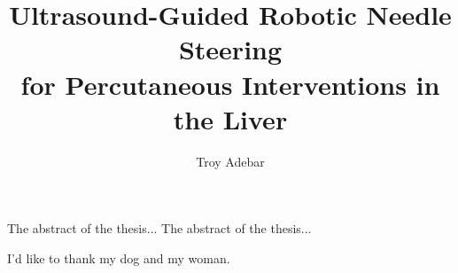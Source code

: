 \documentclass[12pt,twoside]{report}
\begin{document}
\renewcommand{\thepage}{\roman{page}}%

\title{Ultrasound-Guided Robotic Needle Steering\\
            for Percutaneous Interventions in the Liver}
\author{Troy Adebar}
 
\beforepreface

The abstract of the thesis... The abstract of the thesis...


I'd like to thank my dog and my woman. 

\tableofcontents

\listoftables

\listoffigures

 
\pagestyle{headings}


\renewcommand{\thepage}{\arabic{page}}%






\end{document}
